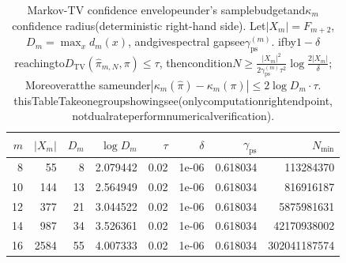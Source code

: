 \begin{table}[H]
\centering
\scriptsize
\setlength{\tabcolsep}{5pt}
\caption{Markov-TV confidence envelopeunder's samplebudgetand$\kappa_m$ confidence radius(deterministic right-hand side). Let$|X_m|=F_{m+2}$, $D_m=\max_x d_m(x)$, andgivespectral gapsee$\gamma^{(m)}_{\mathrm{ps}}$. ifby$1-\delta$ reachingto$D_{\mathrm{TV}}(\hat\pi_{m,N},\pi)\le \tau$, thencondition$N\ge \frac{|X_m|^2}{2\gamma^{(m)}_{\mathrm{ps}}\tau^2}\log\frac{2|X_m|}{\delta}$; Moreoveratthe sameunder$|\kappa_m(\hat\pi)-\kappa_m(\pi)|\le 2\log D_m\cdot \tau$. thisTableTakeonegroupshowingsee(onlycomputationrightendpoint, notdualrateperformnumericalverification).}
\label{tab:fold_kappa_tv_budget}
\begin{tabular}{r r r r r r r r}
\toprule
$m$ & $|X_m|$ & $D_m$ & $\log D_m$ & $\tau$ & $\delta$ & $\gamma_{\mathrm{ps}}$ & $N_{\min}$\\
\midrule
8 & 55 & 8 & 2.079442 & 0.02 & 1e-06 & 0.618034 & 113284370\\
10 & 144 & 13 & 2.564949 & 0.02 & 1e-06 & 0.618034 & 816916187\\
12 & 377 & 21 & 3.044522 & 0.02 & 1e-06 & 0.618034 & 5875981631\\
14 & 987 & 34 & 3.526361 & 0.02 & 1e-06 & 0.618034 & 42170938002\\
16 & 2584 & 55 & 4.007333 & 0.02 & 1e-06 & 0.618034 & 302041187574\\
\bottomrule
\end{tabular}
\end{table}
